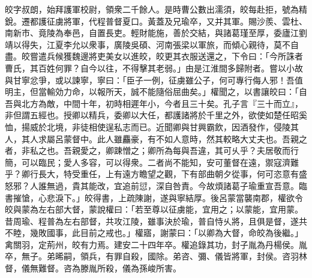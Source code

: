 \begin{pinyinscope}
 
 
 皎字叔朗，始拜護軍校尉，領衆二千餘人。是時曹公數出濡須，皎每赴拒，號為精銳。遷都護征虜將軍，代程普督夏口。黃蓋及兄瑜卒，又并其軍。賜沙羨、雲杜、南新市、竟陵為奉邑，自置長吏。輕財能施，善於交結，與諸葛瑾至厚，委廬江劉靖以得失，江夏李允以衆事，廣陵吳碩、河南張梁以軍旅，而傾心親待，莫不自盡。皎嘗遣兵候獲魏邊將吏美女以進皎，皎更其衣服送還之，下令曰：「今所誅者曹氏，其百姓何罪？自今以往，不得擊其老弱。」由是江淮間多歸附者。嘗以小故與甘寧忿爭，或以諫寧，寧曰：「臣子一例，征虜雖公子，何可專行侮人邪！吾值明主，但當輸効力命，以報所天，誠不能隨俗屈曲矣。」權聞之，以書讓皎曰：「自吾與北方為敵，中間十年，初時相遲年小，今者且三十矣。孔子言『三十而立』，非但謂五經也。授卿以精兵，委卿以大任，都護諸將於千里之外，欲使如楚任昭奚恤，揚威於北境，非徒相使逞私志而已。近聞卿與甘興霸飲，因酒發作，侵陵其人，其人求屬呂蒙督中。此人雖麤豪，有不如人意時，然其較略大丈夫也。吾親之者，非私之也。吾親愛之，卿踈憎之；卿所為每與吾違，其可乆乎？夫居敬而行簡，可以臨民；愛人多容，可以得衆。二者尚不能知，安可董督在遠，禦寇濟難乎？卿行長大，特受重任，上有遠方瞻望之觀，下有部曲朝夕從事，何可恣意有盛怒邪？人誰無過，貴其能改，宜追前愆，深自咎責。今故煩諸葛子瑜重宣吾意。臨書摧愴，心悲淚下。」皎得書，上疏陳謝，遂與寧結厚。後呂蒙當襲南郡，權欲令皎與蒙為左右部大督，蒙說權曰：「若至尊以征虜能，宜用之；以蒙能，宜用蒙。昔周瑜、程普為左右部督，共攻江陵，雖事決於瑜，普自恃乆將，且俱是督，遂共不睦，幾敗國事，此目前之戒也。」權寤，謝蒙曰：「以卿為大督，命皎為後繼。」禽關羽，定荊州，皎有力焉。建安二十四年卒。權追錄其功，封子胤為丹楊侯。胤卒，無子。弟晞嗣，領兵，有罪自殺，國除。弟咨、彌、儀皆將軍，封侯。咨羽林督，儀無難督。咨為滕胤所殺，儀為孫峻所害。
 
 
\end{pinyinscope}